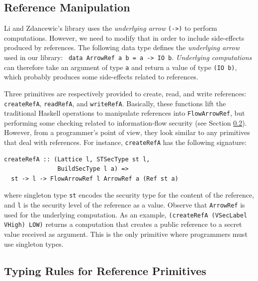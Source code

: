 \documentclass[times, 10pt,twocolumn]{article}
\begin{document}
\subsection{Reference Manipulation}

Li and Zdancewic's library uses the \emph{underlying arrow}
\texttt{(->)} to perform computations. However, we need to 
modify that in order to include side-effects produced by references.
The following data type defines the \emph{underlying arrow} used in 
our library: \texttt{
data ArrowRef a b = a -> IO b}.
%
\emph{Underlying computations} can therefore take an argument of type
\texttt{a} and return a value of type \texttt{(IO b)}, which probably
produces some side-effects related to references.


Three primitives are  respectively provided to create, read, and 
write references:
\texttt{createRefA}, \texttt{readRefA}, 
and \texttt{writeRefA}. 
Basically, 
these functions lift the traditional Haskell operations to manipulate references into 
\texttt{FlowArrowRef}, but performing some checking related to
information-flow security (see Section
\ref{sec:typing-rules-references}). However, from a programmer's point
of view, they look similar to any primitives that deal with
references. For instance, \texttt{createRefA} has the following signature:
\begin{Verbatim}[fontsize=\footnotesize]
createRefA :: (Lattice l, STSecType st l, 
               BuildSecType l a) =>
  st -> l -> FlowArrowRef l ArrowRef a (Ref st a)
\end{Verbatim}
where singleton type \texttt{st} encodes the security type for the content of the
reference, and \texttt{l} is the security level of the reference as
a value. Observe 
that \texttt{ArrowRef} is used for the underlying computation. 
As an example, \texttt{(createRefA (VSecLabel VHigh) LOW)}
returns a computation that creates a public reference to a
secret value received as argument. This is the only primitive
where programmers must use singleton types.


  
\subsection{Typing Rules for Reference Primitives }
\label{sec:typing-rules-references}
\end{document}

